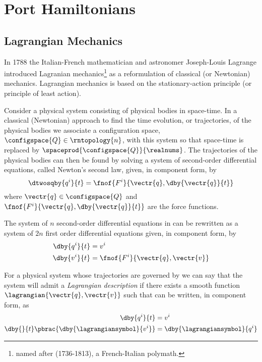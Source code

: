 \clearemptydoublepage
\chapter{Port Hamiltonians}
\label{cha:PortHamiltonians}

\section{Lagrangian Mechanics}
\label{sec:PHLagrangianMechanics}

In 1788 the Italian-French mathematician and astronomer Joseph-Louis Lagrange introduced Lagranian mechanics\footnote{named after
 (1736-1813), a French-Italian polymath.}
as a reformulation of classical (or Newtonian) mechanics. Lagrangian
mechanics is based on the stationary-action principle (or principle of
least action).

Consider a physical system consisting of physical bodies in
space-time. In a classical (Newtonian) approach to find the time
evolution, or trajectories, of the physical bodies we associate a
configuration space, $\configspace{Q}\in\rntopology{n}$, with this
system so that space-time is replaced by
$\spaceprod{\configspace{Q}}{\realnums}$. The trajectories of the
physical bodies can then be found by solving a system of second-order
differential equations, called Newton's second law, given, in component form, by
\begin{equation}
  \dtwosqby{q^{i}}{t}=\fnof{F^{i}}{\vectr{q},\dby{\vectr{q}}{t}}
  \label{eqn:LagragianNewtonsSecondLaw}
\end{equation}
where $\vectr{q}\in\configspace{Q}$ and
$\fnof{F^{i}}{\vectr{q},\dby{\vectr{q}}{t}}$ are the force
functions.

The system of $n$ second-order differential equations
in  can be rewritten as a
system of $2n$ first order differential equations given, in component form, by
\begin{equation}
  \begin{aligned}
    \dby{q^{i}}{t}&=v^{i} \\
    \dby{v^{i}}{t}&=\fnof{F^{i}}{\vectr{q},\vectr{v}}
  \end{aligned}
  \label{eqn:LagragianNewtonsSecondLawFirstOrder}
\end{equation}

For a physical system whose trajectories are governed
by  we can say that
the system will admit a \emph{Lagrangian description} if there exists
a smooth function $\lagrangian{\vectr{q},\vectr{v}}$ such
that  can be written,
in component form, as
\begin{equation}
  \begin{aligned}
    \dby{q^{i}}{t}&=v^{i} \\
    \dby{}{t}\pbrac{\dby{\lagrangiansymbol}{v^{i}}}&=\dby{\lagrangiansymbol}{q^{i}}
  \end{aligned}
  \label{eqn:LagragianNewtonsSecondLagrangianForm}
\end{equation}

